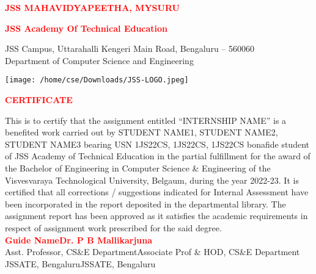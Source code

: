 \documentclass[12pt]{article}
\begin{document}
	\huge
	\textbf{\textcolor{red}{JSS MAHAVIDYAPEETHA, MYSURU}}
	\vspace{0.5cm}
	\Large
	\begin{center}
		\textbf{\textcolor{red}{JSS Academy Of Technical Education}}
	\end{center}
	\normalsize
	\begin{center}
		JSS Campus, Uttarahalli Kengeri Main Road, Bengaluru – 560060\\
		Department of Computer Science and Engineering\\
	\end{center}
	\begin{center}
		\texttt{[image: /home/cse/Downloads/JSS-LOGO.jpeg]}
	\end{center}
	\Large
	\vspace{1.5cm}
	
	\hspace{5.9cm}\textbf{\textcolor{red}{CERTIFICATE}}\\
	
	
	\normalsize
	\begin{doublespace}This is to certify that the assignment entitled “INTERNSHIP NAME” is a benefited
		work carried out by STUDENT NAME1, STUDENT NAME2, STUDENT NAME3
		bearing USN 1JS22CS, 1JS22CS, 1JS22CS bonafide student of JSS Academy of
		Technical Education in the partial fulfillment for the award of the Bachelor of
		Engineering in Computer Science \& Engineering of the Visvesvaraya Technological
		University, Belgaum, during the year 2022-23. It is certified that all corrections /
		suggestions indicated for Internal Assessment have been incorporated in the report
		deposited in the departmental library. The assignment report has been approved as it
		satisfies the academic requirements in respect of assignment work prescribed for
		the said degree.\\
		
		
	\vspace{2cm}
	\textbf{\textcolor{red}{Guide Name}}\hspace{7.9cm}\textbf{\textcolor{red}{Dr. P
				B Mallikarjuna}}\\
	Asst. Professor, CS\&E Department\hspace{3.9cm}Associate Prof \& HOD, CS\&E Department\\
	JSSATE, Bengaluru\hspace{7.6cm}JSSATE, Bengaluru
	\end{doublespace}
\end{document}
